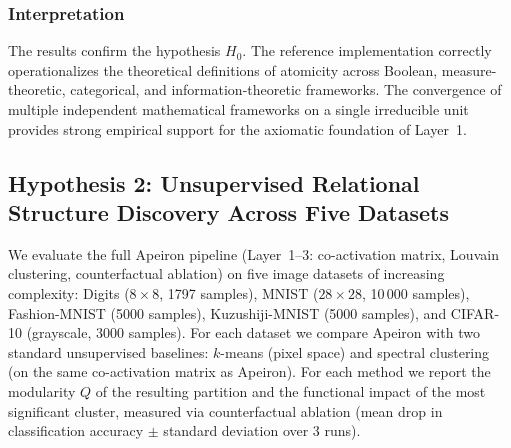 \subsubsection{Interpretation}
The results confirm the hypothesis $H_0$. The reference implementation correctly operationalizes the theoretical definitions of atomicity across Boolean, measure-theoretic, categorical, and information-theoretic frameworks. The convergence of multiple independent mathematical frameworks on a single irreducible unit provides strong empirical support for the axiomatic foundation of Layer~1.

\subsection{Hypothesis 2: Unsupervised Relational Structure Discovery Across Five Datasets}
\label{subsec:validation-h2}

We evaluate the full Apeiron pipeline (Layer~1--3: co-activation matrix,
Louvain clustering, counterfactual ablation) on five image datasets of
increasing complexity: Digits (\(8\times8\), 1797 samples), MNIST
(\(28\times28\), 10\,000 samples), Fashion-MNIST (5000 samples),
Kuzushiji-MNIST (5000 samples), and CIFAR-10 (grayscale,
3000 samples). For each dataset we compare Apeiron with two standard
unsupervised baselines: \(k\)-means (pixel space) and spectral
clustering (on the same co-activation matrix as Apeiron). For each
method we report the modularity \(Q\) of the resulting partition and
the functional impact of the most significant cluster, measured via
counterfactual ablation (mean drop in classification accuracy
\(\pm\) standard deviation over 3 runs).

